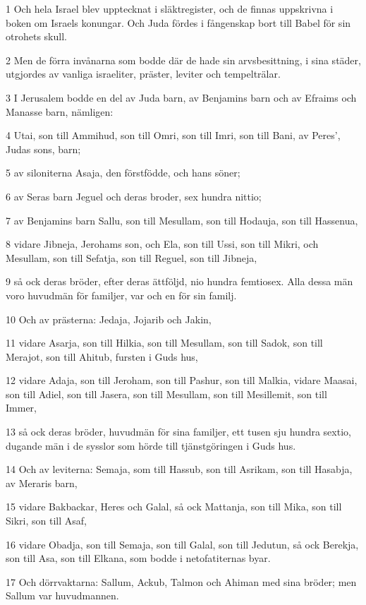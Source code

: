 \par 1 Och hela Israel blev upptecknat i släktregister, och de finnas uppskrivna i boken om Israels konungar. Och Juda fördes i fångenskap bort till Babel för sin otrohets skull.
\par 2 Men de förra invånarna som bodde där de hade sin arvsbesittning, i sina städer, utgjordes av vanliga israeliter, präster, leviter och tempelträlar.
\par 3 I Jerusalem bodde en del av Juda barn, av Benjamins barn och av Efraims och Manasse barn, nämligen:
\par 4 Utai, son till Ammihud, son till Omri, son till Imri, son till Bani, av Peres', Judas sons, barn;
\par 5 av siloniterna Asaja, den förstfödde, och hans söner;
\par 6 av Seras barn Jeguel och deras broder, sex hundra nittio;
\par 7 av Benjamins barn Sallu, son till Mesullam, son till Hodauja, son till Hassenua,
\par 8 vidare Jibneja, Jerohams son, och Ela, son till Ussi, son till Mikri, och Mesullam, son till Sefatja, son till Reguel, son till Jibneja,
\par 9 så ock deras bröder, efter deras ättföljd, nio hundra femtiosex. Alla dessa män voro huvudmän för familjer, var och en för sin familj.
\par 10 Och av prästerna: Jedaja, Jojarib och Jakin,
\par 11 vidare Asarja, son till Hilkia, son till Mesullam, son till Sadok, son till Merajot, son till Ahitub, fursten i Guds hus,
\par 12 vidare Adaja, son till Jeroham, son till Pashur, son till Malkia, vidare Maasai, son till Adiel, son till Jasera, son till Mesullam, son till Mesillemit, son till Immer,
\par 13 så ock deras bröder, huvudmän för sina familjer, ett tusen sju hundra sextio, dugande män i de sysslor som hörde till tjänstgöringen i Guds hus.
\par 14 Och av leviterna: Semaja, som till Hassub, son till Asrikam, son till Hasabja, av Meraris barn,
\par 15 vidare Bakbackar, Heres och Galal, så ock Mattanja, son till Mika, son till Sikri, son till Asaf,
\par 16 vidare Obadja, son till Semaja, son till Galal, son till Jedutun, så ock Berekja, son till Asa, son till Elkana, som bodde i netofatiternas byar.
\par 17 Och dörrvaktarna: Sallum, Ackub, Talmon och Ahiman med sina bröder; men Sallum var huvudmannen.
